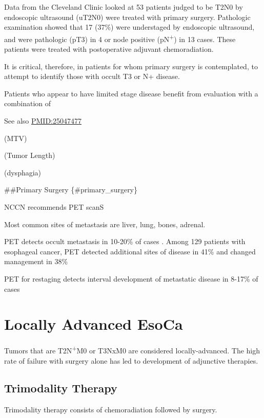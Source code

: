 \documentclass[
]{book}
\begin{document}
Data from the Cleveland Clinic looked at 53 patients judged to be T2N0 by endoscopic ultrasound (uT2N0) were treated with primary surgery. Pathologic examination showed that 17 (37\%) were understaged by endoscopic ultrasound, and were pathologic (pT3) in 4 or node positive (pN\textsuperscript{+}) in 13 cases. These patients were treated with postoperative adjuvant chemoradiation.\citep{rice317}

It is critical, therefore, in patients for whom primary surgery is contemplated, to attempt to identify those with occult T3 or N+ disease.

Patients who appear to have limited stage disease benefit from evaluation with a combination of

See also \url{PMID:25047477}

(MTV)

(Tumor Length)

(dysphagia)

\#\#Primary Surgery \{\#primary\_surgery\}

NCCN recommends PET scanS

Most common sites of metastasis are liver, lung, bones, adrenal.

PET detects occult metastasis in 10-20\% of cases \citep[\citet{kim403}]{kato921}. Among 129 patients with esophageal cancer, PET detected additional sites of disease in 41\% and changed management in 38\% \citep{chatterton354}

PET for restaging detects interval development of metastatic disease in 8-17\% of cases \citep{vanvliet547}

\hypertarget{locally_advanced}{%
\chapter{Locally Advanced EsoCa}\label{locally_advanced}}

Tumors that are T2N\textsuperscript{+}M0 or T3NxM0 are considered locally-advanced. The high rate of failure with surgery alone has led to development of adjunctive therapies.

\hypertarget{trimodality}{%
\section{Trimodality Therapy}\label{trimodality}}

Trimodality therapy consists of chemoradiation followed by surgery.
\end{document}
